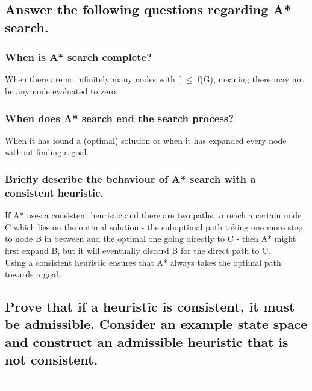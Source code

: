 \documentclass[paper=a4, fontsize=11pt]{scrartcl} %
\numberwithin{equation}{section} %
\numberwithin{figure}{section} %
\numberwithin{table}{section} %
\begin{document}
\subsection{Answer the following questions regarding A* search.}

\subsubsection{When is A* search complete?}
When there are no infinitely many nodes with f $\leq$ f(G), meaning there may not be any node evaluated to zero.

\subsubsection{When does A* search end the search process?}
When it has found a (optimal) solution or when it has expanded every node without finding a goal.

\subsubsection{Briefly describe the behaviour of A* search with a consistent heuristic.}
If A* uses a consistent heuristic and there are two paths to reach a certain node C which lies on the optimal solution - the suboptimal path taking one more step to node B in between and the optimal one going directly to C - then A* might first expand B, but it will eventually discard B for the direct path to C.\\
Using a consistent heuristic ensures that A* always takes the optimal path towards a goal.

\subsection{Prove that if a heuristic is consistent, it must be admissible. Consider an example state
space and construct an admissible heuristic that is not consistent.}

---
\end{document}
